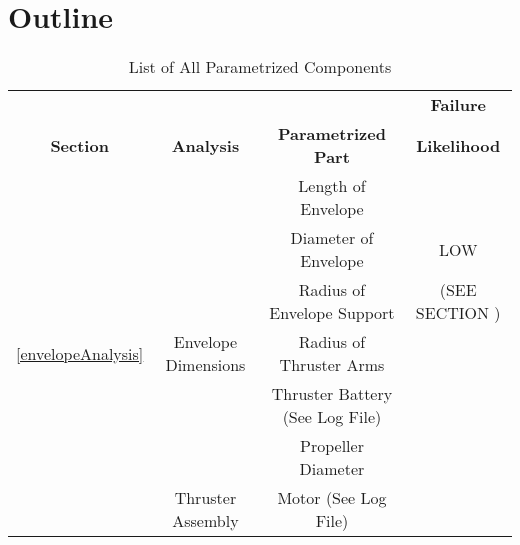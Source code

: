 \documentclass[../main.tex]{subfiles}
\begin{document}
\section{Outline}

\begin{table}[H]
	\centering
	\caption{List of All Parametrized Components}
	\label{allComponents}
	\begin{tabular}{|c|c|c|c|}
		\hline
		&                                       &                                                                  & \textbf{Failure}                                                      \\
		\multirow{-2}{*}{\textbf{Section}}       & \multirow{-2}{*}{\textbf{Analysis}}   & \multirow{-2}{*}{\textbf{Parametrized Part}}                     & \textbf{Likelihood}                                                   \\ \hline
		&                                       & Length of Envelope                                               &                                                                       \\ \cline{3-3}
		&                                       & Diameter of Envelope                                             & LOW                                                                   \\ \cline{3-3}
		&                                       & Radius of Envelope Support                                       & (SEE SECTION )                                                        \\ \cline{3-3}
		\multirow{-4}{*}{\ref{envelopeAnalysis}} & \multirow{-4}{*}{Envelope Dimensions} & Radius of Thruster Arms                                          & \multicolumn{1}{l|}{}                                                 \\ \hline
		&                                       & Thruster Battery (See Log File)                                  & \cellcolor[HTML]{C0C0C0}                                              \\ \cline{3-3}
		&                                       & Propeller Diameter                                               & \cellcolor[HTML]{C0C0C0}                                              \\ \cline{3-3}
		& Thruster Assembly                     & Motor (See Log File)                                             & \cellcolor[HTML]{C0C0C0}                                              \\ \cline{3-3}

\end{tabular}
\end{table}
\end{document}

